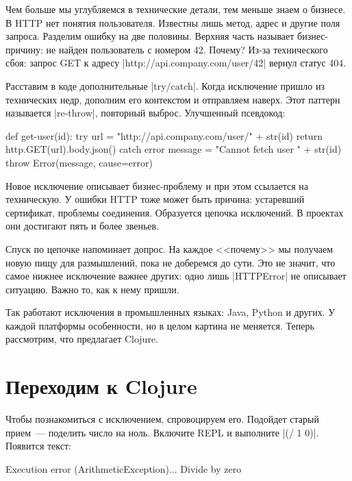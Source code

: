 Чем больше мы углубляемся в технические детали, тем меньше знаем о бизнесе. В
HTTP нет понятия пользователя. Известны лишь метод, адрес и другие поля
запроса. Разделим ошибку на две половины. Верхняя часть называет бизнес-причину:
не найден пользователь с номером 42. Почему? Из-за технического сбоя: запрос GET
к адресу \spverb|http://api.company.com/user/42| вернул статус 404.

Расставим в коде дополнительные \spverb|try/catch|. Когда исключение пришло из
технических недр, дополним его контекстом и отправляем наверх. Этот паттерн
называется \spverb|re-throw|, повторный выброс. Улучшенный псевдокод:

\begin{english}
  \begin{js}
def get-user(id):
  try {
    url = "http://api.company.com/user/" + str(id)
    return http.GET(url).body.json()
  } catch error {
    message = "Cannot fetch user " + str(id)
    throw Error(message, cause=error)
  }
  \end{js}
\end{english}

Новое исключение описывает бизнес-проблему и при этом ссылается на
техническую. У ошибки HTTP тоже может быть причина: устаревший сертификат,
проблемы соединения. Образуется цепочка исключений. В проектах они достигают
пять и более звеньев.

Спуск по цепочке напоминает допрос. На каждое <<почему>> мы получаем новую пищу
для размышлений, пока не доберемся до сути. Это не значит, что самое нижнее
исключение важнее других: одно лишь \spverb|HTTPError| не описывает
ситуацию. Важно то, как к нему пришли.

Так работают исключения в промышленных языках: Java, Python и других. У каждой
платформы особенности, но в целом картина не меняется. Теперь рассмотрим, что
предлагает Clojure.

\section{Переходим к Clojure}

Чтобы познакомиться с исключением, спровоцируем его. Подойдет старый прием~---
поделить число на ноль. Включите REPL и выполните \spverb|(/ 1 0)|. Появится
текст:

\begin{english}
  \begin{text}
Execution error (ArithmeticException)...
Divide by zero
  \end{text}
\end{english}

